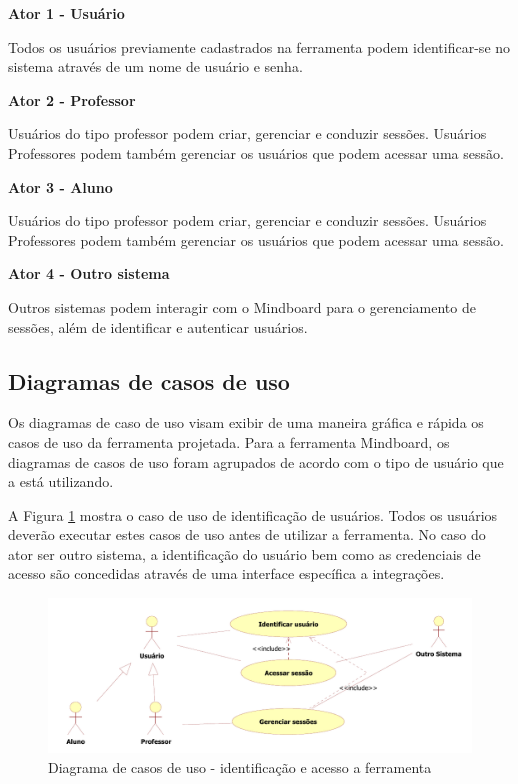 \textbf{Ator 1 - Usuário}

Todos os usuários previamente cadastrados na ferramenta podem identificar-se no sistema através de um nome de usuário e senha.

\textbf{Ator 2 - Professor}

Usuários do tipo professor podem criar, gerenciar e conduzir sessões. Usuários Professores podem também gerenciar os usuários que podem acessar uma sessão.

\textbf{Ator 3 - Aluno}

Usuários do tipo professor podem criar, gerenciar e conduzir sessões. Usuários Professores podem também gerenciar os usuários que podem acessar uma sessão.

\textbf{Ator 4 - Outro sistema}

Outros sistemas podem interagir com o Mindboard para o gerenciamento de sessões, além de identificar e autenticar usuários.

\subsection{Diagramas de casos de uso}

Os diagramas de caso de uso visam exibir de uma maneira gráfica e rápida os casos de uso da ferramenta projetada. Para a ferramenta Mindboard, os diagramas de casos de uso foram agrupados de acordo com o tipo de usuário que a está utilizando. 

A Figura \ref{fig:use_case1} mostra o caso de uso de identificação de usuários. Todos os usuários deverão executar estes casos de uso antes de utilizar a ferramenta. No caso do ator ser outro sistema, a identificação do usuário bem como as credenciais de acesso são concedidas através de uma interface específica a integrações.
 
\begin{figure}[!h]
\centering
\includegraphics[width=1.0\textwidth]{pdfs/img-use-case1.pdf} 
\caption{Diagrama de casos de uso - identificação e acesso a ferramenta}
\label{fig:use_case1} 
\end{figure}

